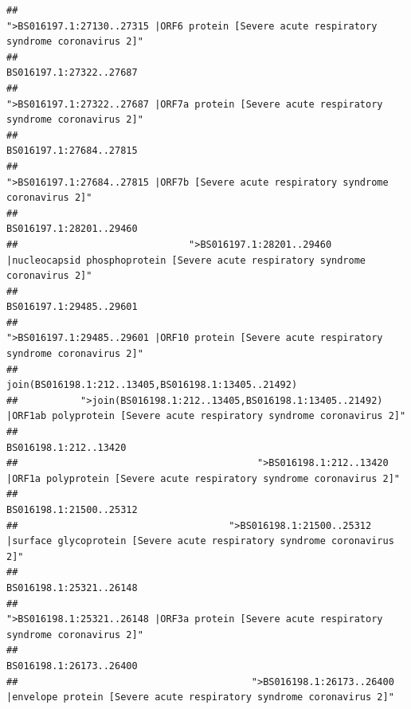 \documentclass[
]{article}
\begin{document}
\begin{verbatim}
##                                             ">BS016197.1:27130..27315 |ORF6 protein [Severe acute respiratory syndrome coronavirus 2]" 
##                                                                                                                BS016197.1:27322..27687 
##                                            ">BS016197.1:27322..27687 |ORF7a protein [Severe acute respiratory syndrome coronavirus 2]" 
##                                                                                                                BS016197.1:27684..27815 
##                                                    ">BS016197.1:27684..27815 |ORF7b [Severe acute respiratory syndrome coronavirus 2]" 
##                                                                                                                BS016197.1:28201..29460 
##                              ">BS016197.1:28201..29460 |nucleocapsid phosphoprotein [Severe acute respiratory syndrome coronavirus 2]" 
##                                                                                                                BS016197.1:29485..29601 
##                                            ">BS016197.1:29485..29601 |ORF10 protein [Severe acute respiratory syndrome coronavirus 2]" 
##                                                                                    join(BS016198.1:212..13405,BS016198.1:13405..21492) 
##           ">join(BS016198.1:212..13405,BS016198.1:13405..21492) |ORF1ab polyprotein [Severe acute respiratory syndrome coronavirus 2]" 
##                                                                                                                  BS016198.1:212..13420 
##                                          ">BS016198.1:212..13420 |ORF1a polyprotein [Severe acute respiratory syndrome coronavirus 2]" 
##                                                                                                                BS016198.1:21500..25312 
##                                     ">BS016198.1:21500..25312 |surface glycoprotein [Severe acute respiratory syndrome coronavirus 2]" 
##                                                                                                                BS016198.1:25321..26148 
##                                            ">BS016198.1:25321..26148 |ORF3a protein [Severe acute respiratory syndrome coronavirus 2]" 
##                                                                                                                BS016198.1:26173..26400 
##                                         ">BS016198.1:26173..26400 |envelope protein [Severe acute respiratory syndrome coronavirus 2]" 

\end{verbatim}
\end{document}
